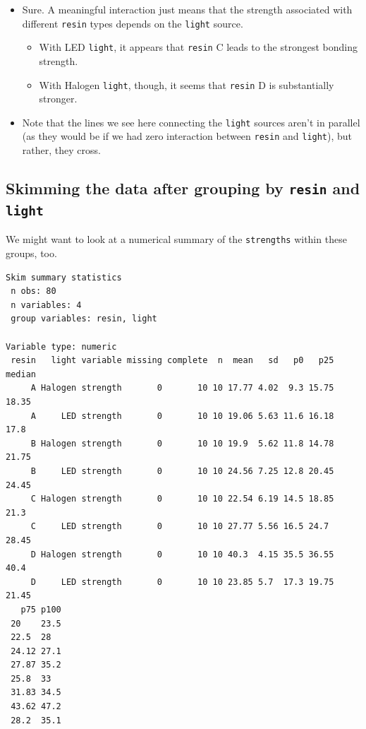 \documentclass[]{book}
\newenvironment{Shaded}{\begin{snugshade}}{\end{snugshade}}
\newcommand{\KeywordTok}[1]{\textcolor[rgb]{0.13,0.29,0.53}{\textbf{#1}}}
\newcommand{\StringTok}[1]{\textcolor[rgb]{0.31,0.60,0.02}{#1}}
\newcommand{\OperatorTok}[1]{\textcolor[rgb]{0.81,0.36,0.00}{\textbf{#1}}}
\newcommand{\NormalTok}[1]{#1}
\providecommand{\tightlist}{%
  \setlength{\itemsep}{0pt}\setlength{\parskip}{0pt}}
\theoremstyle{definition}
\theoremstyle{definition}
\theoremstyle{definition}
\theoremstyle{remark}
\begin{document}
\begin{itemize}
\tightlist
\item
  Sure. A meaningful interaction just means that the strength associated
  with different \texttt{resin} types depends on the \texttt{light}
  source.

  \begin{itemize}
  \tightlist
  \item
    With LED \texttt{light}, it appears that \texttt{resin} C leads to
    the strongest bonding strength.
  \item
    With Halogen \texttt{light}, though, it seems that \texttt{resin} D
    is substantially stronger.
  \end{itemize}
\item
  Note that the lines we see here connecting the \texttt{light} sources
  aren't in parallel (as they would be if we had zero interaction
  between \texttt{resin} and \texttt{light}), but rather, they cross.
\end{itemize}

\subsection{\texorpdfstring{Skimming the data after grouping by
\texttt{resin} and
\texttt{light}}{Skimming the data after grouping by resin and light}}\label{skimming-the-data-after-grouping-by-resin-and-light}

We might want to look at a numerical summary of the \texttt{strengths}
within these groups, too.

\begin{Shaded}
\end{Shaded}

\begin{verbatim}
Skim summary statistics
 n obs: 80 
 n variables: 4 
 group variables: resin, light 

Variable type: numeric 
 resin   light variable missing complete  n  mean   sd   p0   p25 median
     A Halogen strength       0       10 10 17.77 4.02  9.3 15.75  18.35
     A     LED strength       0       10 10 19.06 5.63 11.6 16.18  17.8 
     B Halogen strength       0       10 10 19.9  5.62 11.8 14.78  21.75
     B     LED strength       0       10 10 24.56 7.25 12.8 20.45  24.45
     C Halogen strength       0       10 10 22.54 6.19 14.5 18.85  21.3 
     C     LED strength       0       10 10 27.77 5.56 16.5 24.7   28.45
     D Halogen strength       0       10 10 40.3  4.15 35.5 36.55  40.4 
     D     LED strength       0       10 10 23.85 5.7  17.3 19.75  21.45
   p75 p100
 20    23.5
 22.5  28  
 24.12 27.1
 27.87 35.2
 25.8  33  
 31.83 34.5
 43.62 47.2
 28.2  35.1
\end{verbatim}
\end{document}
